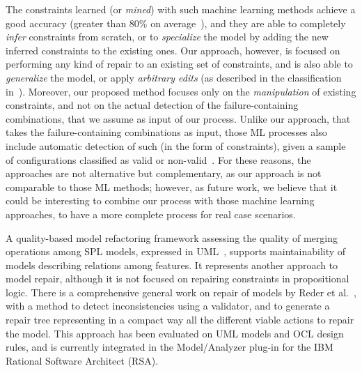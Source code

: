 \begin{tikzborder}{\cite{Gargantini16:validation}}
\begin{tikzborder}{\cite{gargantini_combinatorial_2017}}
\begin{tikzborder}{\cite{gargantini_combinatorial_2017}}
\begin{tikzborder}{\cite{garn2019}}
\begin{tikzborder}{\cite{arcaini2019achieving}}
\begin{tikzborder}{\cite{arcaini2019varivolution}}
		The constraints learned (or \textit{mined}) with such machine learning methods achieve a good accuracy (greater than 80\% on average~\cite{temple_learning_2017}), and they are able to completely \textit{infer} constraints from scratch, or to \textit{specialize} the model by adding the new inferred constraints to the existing ones. Our approach, however, is focused on performing any kind of repair to an existing set of constraints, and is also able to \textit{generalize} the model, or apply \textit{arbitrary edits} (as described in the classification in~\cite{thum_reasoning_2009}). Moreover, our proposed method focuses only on the \textit{manipulation} of existing constraints, and not on the actual detection of the failure-containing combinations, that we assume as input of our process. Unlike our approach, that takes the failure-containing combinations as input, those ML processes also include automatic detection of such \fccs (in the form of constraints), given a sample of configurations classified as valid or non-valid~\cite{temple_learning_2017}. For these reasons, the approaches are not alternative but complementary, as our approach is not comparable to those ML methods; however, as future work, we believe that it could be interesting to combine our process with those machine learning approaches, to have a more complete process for real case scenarios.
		
		A quality-based model refactoring framework assessing the quality of merging operations among SPL models, expressed in UML~\cite{rubin_quality_2013}, supports maintainability of models describing relations among features. It represents another approach to model repair, although it is not focused on repairing constraints in propositional logic. There is a comprehensive general work on repair of models by Reder et al.~\cite{reder_computing_2012}, with a method to detect inconsistencies using a validator, and to generate a repair tree representing in a compact way all the different viable actions to repair the model. This approach has been evaluated on UML models and OCL design rules, and is currently integrated in the Model/Analyzer plug-in for the IBM Rational Software Architect (RSA). 
		\be
		

\end{tikzborder}
\end{tikzborder}
\end{tikzborder}
\end{tikzborder}
\end{tikzborder}
\end{tikzborder}

